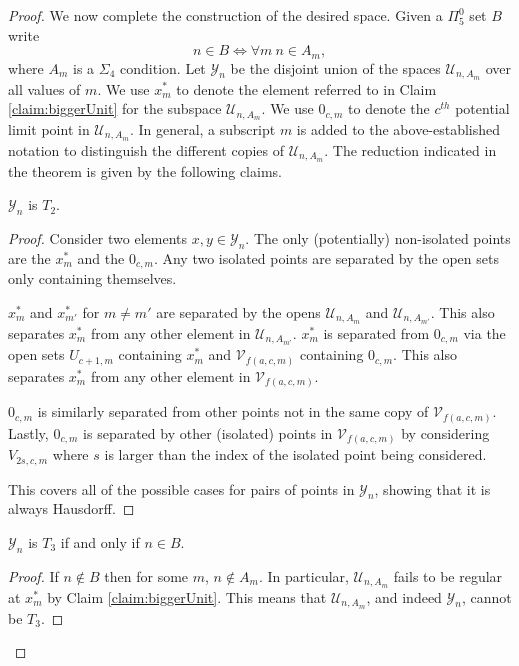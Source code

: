 \documentclass[11pt]{amsart}
\theoremstyle{remark}
\begin{document}
\begin{proof}
    We now complete the construction of the desired space.
    Given a $\Pi_5^0$ set $B$ write
    \[n\in B \iff \forall m ~ n\in A_m,\]
    where $A_m$ is a $\Sigma_4$ condition.
    Let $\mathcal{Y}_n$ be the disjoint union of the spaces $\mathcal{U}_{n,A_m}$ over all values of $m$.
    We use $x^*_m$ to denote the element referred to in Claim \ref{claim:biggerUnit} for the subspace $\mathcal{U}_{n,A_m}$.
    We use $0_{c,m}$ to denote the $c^{th}$ potential limit point in $\mathcal{U}_{n,A_m}$.
    In general, a subscript $m$ is added to the above-established notation to distinguish the different copies of $\mathcal{U}_{n,A_m}$.
    The reduction indicated in the theorem is given by the following claims.

    \begin{claim}\label{claim:T2}
        $\mathcal{Y}_n$ is $T_2$.
    \end{claim}

    \begin{proof}
        Consider two elements $x,y\in\mathcal{Y}_n$.
        The only (potentially) non-isolated points are the $x^*_m$ and the $0_{c,m}$.
        Any two isolated points are separated by the open sets only containing themselves.

        $x^*_m$ and $x^*_{m'}$ for $m\neq m'$ are separated by the opens $\mathcal{U}_{n,A_m}$ and $\mathcal{U}_{n,A_{m'}}$.
        This also separates $x^*_m$ from any other element in $\mathcal{U}_{n,A_{m'}}$.
        $x^*_m$ is separated from $0_{c,m}$ via the open sets $U_{c+1,m}$ containing $x^*_m$ and $\mathcal{V}_{f(a,c,m)}$ containing $0_{c,m}$.
        This also separates $x^*_m$ from any other element in $\mathcal{V}_{f(a,c,m)}$.

        $0_{c,m}$ is similarly separated from other points not in the same copy of $\mathcal{V}_{f(a,c,m)}$.
        Lastly, $0_{c,m}$ is separated by other (isolated) points in $\mathcal{V}_{f(a,c,m)}$ by considering $V_{2s,c,m}$ where $s$ is larger than the index of the isolated point being considered.

        This covers all of the possible cases for pairs of points in $\mathcal{Y}_n$, showing that it is always Hausdorff. 
    \end{proof}

    \begin{claim}\label{claim:T3Reduction}
        $\mathcal{Y}_n$ is $T_3$ if and only if $n\in B$.
    \end{claim}

    \begin{proof}
        If $n\not\in B$ then for some $m$, $n\not\in A_m$.
        In particular, $\mathcal{U}_{n,A_m}$ fails to be regular at $x^*_m$ by Claim \ref{claim:biggerUnit}.
        This means that $\mathcal{U}_{n,A_m}$, and indeed $\mathcal{Y}_n$, cannot be $T_3$.


\end{proof}
\end{proof}
\end{document}
